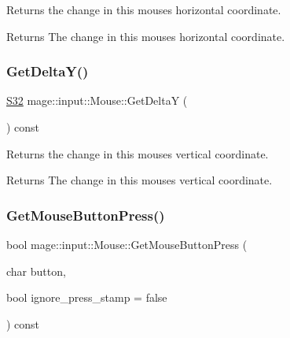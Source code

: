 Returns the change in this mouse\textquotesingle{}s horizontal coordinate.

\begin{DoxyReturn}{Returns}
The change in this mouse\textquotesingle{}s horizontal coordinate. 
\end{DoxyReturn}
\hypertarget{classmage_1_1input_1_1_mouse_a448886ed21c136f1a385101e21093aa3}{}\label{classmage_1_1input_1_1_mouse_a448886ed21c136f1a385101e21093aa3} 
\subsubsection{\texorpdfstring{Get\+Delta\+Y()}{GetDeltaY()}}
{\footnotesize\ttfamily \hyperlink{namespacemage_a642e05c5c83642b6946703615cdbf2da}{S32} mage\+::input\+::\+Mouse\+::\+Get\+DeltaY (\begin{DoxyParamCaption}{ }\end{DoxyParamCaption}) const\hspace{0.3cm}{\ttfamily [noexcept]}}

Returns the change in this mouse\textquotesingle{}s vertical coordinate.

\begin{DoxyReturn}{Returns}
The change in this mouse\textquotesingle{}s vertical coordinate. 
\end{DoxyReturn}
\hypertarget{classmage_1_1input_1_1_mouse_a1aed699ffd28b121e9da426113937f85}{}\label{classmage_1_1input_1_1_mouse_a1aed699ffd28b121e9da426113937f85} 
\subsubsection{\texorpdfstring{Get\+Mouse\+Button\+Press()}{GetMouseButtonPress()}}
{\footnotesize\ttfamily bool mage\+::input\+::\+Mouse\+::\+Get\+Mouse\+Button\+Press (\begin{DoxyParamCaption}\item[{char}]{button,  }\item[{bool}]{ignore\+\_\+press\+\_\+stamp = {\ttfamily false} }\end{DoxyParamCaption}) const\hspace{0.3cm}{\ttfamily [noexcept]}}

